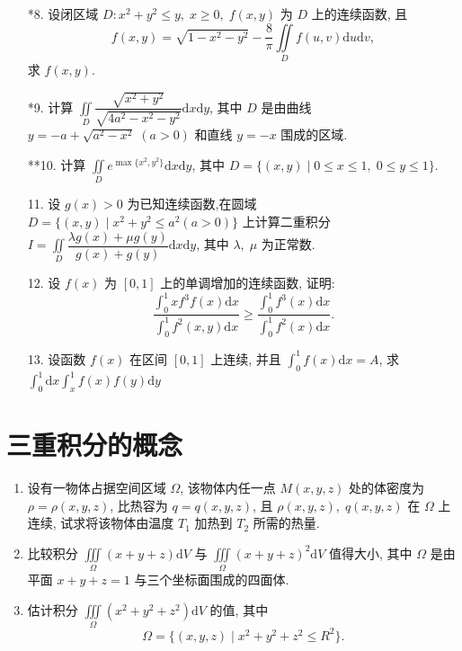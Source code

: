 \begin{enumerate}
    \item[*8.] 设闭区域 $D : x^2+y^2\leqslant y,\;x\geqslant 0,\;f(x, y)$ 为 $D$ 上的连续函数, 且
    \[
        f(x, y)=\sqrt{1-x^2-y^2}-\dfrac{8}{\pi}\iint\limits_{D}f(u, v)\text{d}u\text{d}v,
    \]
    求 $f(x, y)$.

    \item[*9.] 计算 $\displaystyle \iint\limits_{D}\dfrac{\sqrt{x^2+y^2}}{\sqrt{4a^2-x^2-y^2}}\text{d}x\text{d}y$, 其中 $D$ 是由曲线 $y=-a+\sqrt{a^2-x^2}\;(a>0)$ 和直线 $y=-x$ 围成的区域.
    
    \item[**10.] 计算 $\displaystyle\iint\limits_{D}e^{\max\{x^2, y^2\}}\text{d}x\text{d}y$, 其中 $D=\{(x, y) \mid 0\leqslant x\leqslant 1,\;0\leqslant y\leqslant 1\}$.
    
    \item[11.] 设 $g(x)>0$ 为已知连续函数,在圆域 $D=\{(x, y) \mid x^2+y^2\leqslant a^2(a>0)\}$ 上计算二重积分 $\displaystyle I=\iint\limits_{D}\dfrac{\lambda g(x)+\mu g(y)}{g(x)+g(y)}\text{d}x\text{d}y$, 其中 $\lambda,\;\mu$ 为正常数.
    
    \item[12.] 设 $f(x)$ 为 $[0, 1]$ 上的单调增加的连续函数, 证明:
    \[
        \dfrac{\displaystyle\int_0^1xf^3f(x)\text{d}x}{\displaystyle\int_0^1f^2(x, y)\text{d}x}\geqslant \dfrac{\displaystyle\int_0^1f^3(x)\text{d}x}{\displaystyle\int_0^1f^2(x)\text{d}x}.
    \]

    \item[13.] 设函数 $f(x)$ 在区间 $[0, 1]$ 上连续, 并且 $\displaystyle\int_0^1f(x)\text{d}x=A$, 求 $\displaystyle\int_0^1\text{d}x\int_x^1f(x)f(y)\text{d}y$
\end{enumerate}


\section{三重积分的概念}

\begin{enumerate}\setlength{\itemsep}{7pt}
    \item 设有一物体占据空间区域 $\Omega$, 该物体内任一点 $M(x, y, z)$ 处的体密度为 $\rho=\rho(x, y, z)$, 比热容为 $q=q(x, y, z)$, 且 $\rho(x, y, z),\;q(x, y, z)$ 在 $\Omega$ 上连续, 试求将该物体由温度 $T_1$ 加热到 $T_2$ 所需的热量.
    
    \item 比较积分 $\displaystyle\iiint\limits_{\Omega}(x+y+z)\text{d}V$ 与 $\displaystyle\iiint\limits_{\Omega}(x+y+z)^2\text{d}V$ 值得大小, 其中 $\Omega$ 是由平面 $x+y+z=1$ 与三个坐标面围成的四面体.
    
    \item 估计积分 $\displaystyle\iiint\limits_{\Omega}(x^2+y^2+z^2)\text{d}V$ 的值, 其中
    \[
        \Omega=\{(x, y, z) \mid x^2+y^2+z^2\leqslant R^2\}.
    \]
\end{enumerate}


